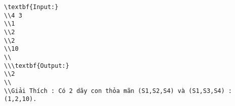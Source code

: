 \begin{verbatim}
\textbf{Input:}
\\4 3
\\1
\\2
\\2
\\10
\\
\\\textbf{Output:}
\\2
\\
\\Giải Thích : Có 2 dãy con thỏa mãn (S1,S2,S4) và (S1,S3,S4) : (1,2,10).\end{verbatim}